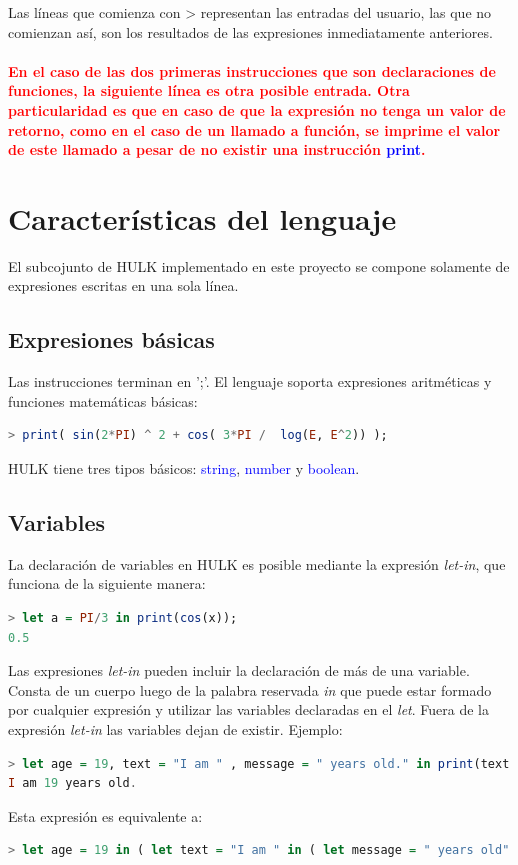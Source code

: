 \documentclass[a4paper, 12pt]{article}
\begin{document}
Las líneas que comienza con >   representan las entradas del usuario, las que no comienzan así, son los resultados de las expresiones inmediatamente anteriores.
\paragraph{\textcolor{red}{En el caso de las dos primeras instrucciones que son declaraciones de funciones, la siguiente línea es otra posible entrada. Otra particularidad es que en caso de que la expresión no tenga un valor de retorno, como en el caso de un llamado a función, se imprime el valor de este llamado a pesar de no existir una instrucción \textcolor{blue}{print}.}}



\newpage
\section{Características del lenguaje}\label{sec;base}
El subcojunto de HULK implementado en este proyecto se compone solamente de expresiones escritas en una sola línea.

\subsection{Expresiones básicas}
Las instrucciones terminan en ';'. El lenguaje soporta expresiones aritméticas  y funciones matemáticas básicas:
\begin{lstlisting}[language= Haskell]
> print( sin(2*PI) ^ 2 + cos( 3*PI /  log(E, E^2)) ); 
\end{lstlisting}
 HULK tiene tres tipos básicos: \textcolor{blue}{string}, \textcolor{blue}{number} y \textcolor{blue}{boolean}.

\subsection{Variables}
La declaración de variables en HULK es posible mediante la expresión \textit{let-in}, que funciona de la siguiente manera:
\begin{lstlisting}[language= Haskell]
> let a = PI/3 in print(cos(x));
0.5
\end{lstlisting}
Las expresiones \textit{let-in} pueden incluir la declaración de más de una variable. Consta de un cuerpo luego de la palabra reservada \textit{in}  que puede estar formado por cualquier expresión y utilizar las variables declaradas en el \textit{let}. Fuera de la expresión \textit{let-in} las variables dejan de existir.
Ejemplo:
\begin{lstlisting}[language= Haskell]
> let age = 19, text = "I am " , message = " years old." in print(text @ age @ message);
I am 19 years old.
\end{lstlisting}
Esta expresión es equivalente a:
\begin{lstlisting}[language= Haskell]
> let age = 19 in ( let text = "I am " in ( let message = " years old"  in print(text @ age @ message))); 
\end{lstlisting}
\end{document}
